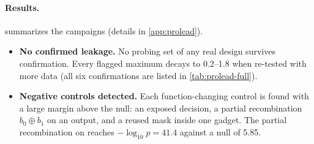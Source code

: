 \begin{table}[t]\centering\small
\caption{Lane-level PROLEAD results (robust glitches + transitions). "null" = expected maximum under no leakage. Confirmations re-test the flagged set alone with $2^{22}$ (frozen base o1: $2^{24}$) simulations.}\label{tab:prolead}
\setlength{\tabcolsep}{2.5pt}
\end{table}

\paragraph{Results.}  summarizes the campaigns (details in \cref{app:prolead}).
\begin{itemize}
  \item \textbf{No confirmed leakage.} No probing set of any real design survives confirmation. Every flagged maximum decays to 0.2--1.8 when re-tested with more data (all six confirmations are listed in \cref{tab:prolead-full}).
  \item \textbf{Negative controls detected.} Each function-changing control is found with a large margin above the null: an exposed decision, a partial recombination $b_0 \oplus b_1$ on an output, and a reused mask inside one gadget. The partial recombination on  reaches $-\log_{10} p = 41.4$ against a null of 5.85.
\end{itemize}

